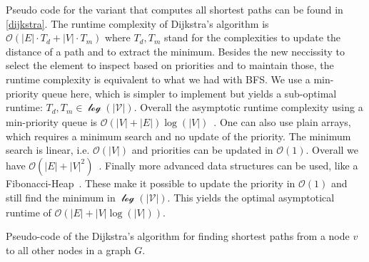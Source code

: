         Pseudo code for the variant that computes all shortest paths can be found in \ref{dijkstra}. 
        The runtime complexity of Dijkstra's algorithm is $\mathcal{O}(|E| \cdot T_d + |V| \cdot T_m)$ where $T_d, T_m$ stand for the complexities to update the distance of a path and to extract the minimum.
        Besides the new neccissity to select the element to inspect based on priorities and to maintain those, the runtime complexity is equivalent to what we had with BFS.        
        We use a min-priority queue here, which is simpler to implement but yields a sub-optimal runtime: $T_d, T_m \in \mathcal{\log(|V|)}$. 
        Overall the asymptotic runtime complexity using a min-priority queue is $\mathcal{O}(|V| + |E|)\log(|V|)$~\autocite{Goodrich2014AlgorithmDA}.        
        One can also use plain arrays, which requires a minimum search and no update of the priority. 
        The minimum search is linear, i.e. $\mathcal{O}(|V|)$ and priorities can be updated in $\mathcal{O}(1)$. 
        Overall we have $\mathcal{O}(|E| + |V|^2)$~\autocite{Goodrich2014AlgorithmDA}.        
        Finally more advanced data structures can be used, like a Fibonacci-Heap~\autocite{cormen2009introduction}. 
        These make it possible to update the priority in $\mathcal{O}(1)$ and still find the minimum in $\mathcal{\log(|V|)}$. This yields the optimal asymptotical runtime of $\mathcal{O}(|E| + |V|\log(|V|))$.
        
        \begin{algorithm}[htp]
            \hrulealg
        \caption{Pseudo-code of the Dijkstra's algorithm for finding shortest paths from a node $v$ to all other nodes in a graph $G$.}\label{dijkstra}
        \end{algorithm}
        
